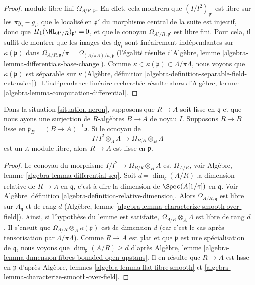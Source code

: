 \begin{proof}
module libre fini $\Omega_{A/R, \mathfrak p}$.
En effet, cela montrera que $(I/I^2)_{\mathfrak p'}$ est libre sur les
$\pi y_i - g_i$, que le localisé en $\mathfrak p'$ du morphisme central
de la suite est injectif, donc que $H_1(\NL_{A'/R})_{\mathfrak p'} = 0$, et que
le conoyau $\Omega_{A'/R, \mathfrak p'}$ est libre fini.
Pour cela, il suffit de montrer que les images des $\text{d}g_i$ sont
linéairement indépendantes sur $\kappa(\mathfrak p)$ dans
$\Omega_{A/R, \mathfrak p}/\pi = \Omega_{(A/\pi A)/\kappa, \mathfrak p}$
(l'égalité résulte d'Algèbre, lemme \ref{algebra-lemma-differentials-base-change}).
Comme $\kappa \subset \kappa(\mathfrak p) \subset \Lambda/\pi \Lambda$,
nous voyons que $\kappa(\mathfrak p)$ est séparable sur $\kappa$
(Algèbre, définition \ref{algebra-definition-separable-field-extension}).
L'indépendance linéaire recherchée résulte alors d'Algèbre,
lemme \ref{algebra-lemma-computation-differential}.
\end{proof}

\begin{lemma}
\label{lemma-neron-when-smooth}
Dans la situation \ref{situation-neron}, supposons que $R \to A$ soit lisse
en $\mathfrak q$ et que nous ayons une surjection de $R$-algèbres
$B \to A$ de noyau $I$. Supposons $R \to B$ lisse en
$\mathfrak p_B = (B \to A)^{-1}\mathfrak p$. Si le conoyau de
$$
I/I^2 \otimes_A \Lambda \to \Omega_{B/R} \otimes_B \Lambda
$$
est un $\Lambda$-module libre, alors $R \to A$ est lisse en $\mathfrak p$.
\end{lemma}

\begin{proof}
Le conoyau du morphisme $I/I^2 \to \Omega_{B/R} \otimes_B A$
est $\Omega_{A/R}$, voir Algèbre, lemme \ref{algebra-lemma-differential-seq}.
Soit $d = \dim_\mathfrak q(A/R)$ la dimension relative de $R \to A$
en $\mathfrak q$, c'est-à-dire la dimension de $\Spec(A[1/\pi])$ en $\mathfrak q$.
Voir Algèbre, définition \ref{algebra-definition-relative-dimension}.
Alors $\Omega_{A/R, \mathfrak q}$ est libre sur $A_\mathfrak q$ et de rang $d$
(Algèbre, lemme \ref{algebra-lemma-characterize-smooth-over-field}).
Ainsi, si l'hypothèse du lemme est satisfaite,
$\Omega_{A/R} \otimes_A \Lambda$ est libre de rang $d$.
Il s'ensuit que $\Omega_{A/R} \otimes_A \kappa(\mathfrak p)$
est de dimension $d$ (car c'est le cas après tensorisation par $\Lambda/\pi \Lambda$).
Comme $R \to A$ est plat et que $\mathfrak p$
est une spécialisation de $\mathfrak q$, nous voyons que
$\dim_\mathfrak p(A/R) \geq d$ d'après Algèbre, lemme
\ref{algebra-lemma-dimension-fibres-bounded-open-upstairs}.
Il en résulte que $R \to A$ est lisse en $\mathfrak p$ d'après
Algèbre, lemmes \ref{algebra-lemma-flat-fibre-smooth} et
\ref{algebra-lemma-characterize-smooth-over-field}.
\end{proof}

